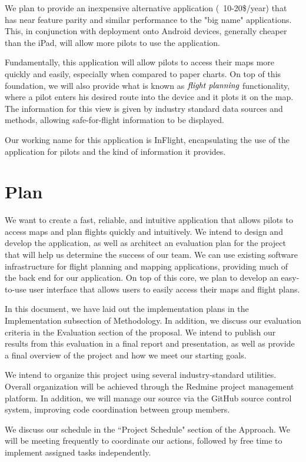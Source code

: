 \documentclass[10pt,a4paper]{article}
\begin{document}
We plan to provide an inexpensive alternative application (~10-20\$/year) that has near feature parity and similar performance to the "big name" applications. This, in conjunction with deployment onto Android devices, generally cheaper than the iPad, will allow more pilots to use the application.

Fundamentally, this application will allow pilots to access their maps more quickly and easily, especially when compared to paper charts. On top of this foundation, we will also provide what is known as $\emph{flight planning}$ functionality, where a pilot enters his desired route into the device and it plots it on the map. The information for this view is given by industry standard data sources and methods, allowing safe-for-flight information to be displayed.

Our working name for this application is InFlight, encapsulating the use of the application for pilots and the kind of information it provides.
\section{Plan}
We want to create a fast, reliable, and intuitive application that allows pilots to access maps and plan flights quickly and intuitively. We intend to design and develop the application, as well as architect an evaluation plan for the project that will help us determine the success of our team. We can use existing software infrastructure for flight planning and mapping applications, providing much of the back end for our application. On top of this core, we plan to develop an easy-to-use user interface that allows users to easily access their maps and flight plans. 

In this document, we have laid out the implementation plans in the Implementation subsection of Methodology. In addition, we discuss our evaluation criteria in the Evaluation section of the proposal. We intend to publish our results from this evaluation in a final report and presentation, as well as provide a final overview of the project and how we meet our starting goals.

We intend to organize this project using several industry-standard utilities. Overall organization will be achieved through the Redmine project management platform. In addition, we will manage our source via the GitHub source control system, improving code coordination between group members. 

We discuss our schedule in the ``Project Schedule" section of the Approach. We will be meeting frequently to coordinate our actions, followed by free time to implement assigned tasks independently.
\end{document}
